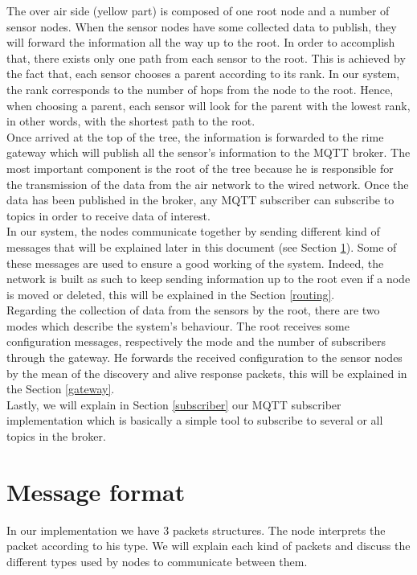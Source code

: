 \documentclass[a4paper,10pt]{article}
\begin{document}
The over air side (yellow part) is composed of one root node and a number of sensor nodes. When the sensor nodes have some collected data to publish, they will forward the information all the way up to the root. In order to accomplish that, there exists only one path from each sensor to the root. This is achieved by the fact that, each sensor chooses a parent according to its rank. In our system, the rank corresponds to the number of hops from the node to the root. Hence, when choosing a parent, each sensor will look for the parent with the lowest rank, in other words, with the shortest path to the root. \\

Once arrived at the top of the tree, the information is forwarded to the rime gateway which will publish all the sensor's information to the MQTT broker. The most important component is the root of the tree because he is responsible for the transmission of the data from the air network to the wired network. Once the data has been published in the broker, any MQTT subscriber can subscribe to topics in order to receive data of interest. \\

In our system, the nodes communicate together by sending different kind of messages that will be explained later in this document (see Section \ref{msgFormat}). Some of these messages are used to ensure a good working of the system. Indeed, the network is built as such to keep sending information up to the root even if a node is moved or deleted, this will be explained in the Section \ref{routing}. \\


Regarding the collection of data from the sensors by the root, there are two modes which describe the system's behaviour. The root receives some configuration messages, respectively the mode and the number of subscribers through the gateway.  He forwards the received configuration to the sensor nodes by the mean of the discovery and alive response packets, this will be explained in the Section \ref{gateway}. \\

Lastly, we will explain in Section \ref{subscriber} our MQTT subscriber implementation which is basically a simple tool to subscribe to several or all topics in the broker.



\section{Message format}
\label{msgFormat}
In our implementation we have 3 packets structures. The node interprets the packet according to his type. We will explain each kind of packets and discuss the different types used by nodes to communicate between them.
\end{document}
